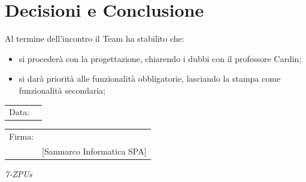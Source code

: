 \documentclass[a4paper,12pt]{article}
\begin{document}
\section{Decisioni e Conclusione}

Al termine dell’incontro il Team ha stabilito che:
\begin{itemize}
    \item si procederà con la progettazione, chiarendo i dubbi con il professore Cardin;
    \item si darà priorità alle funzionalità obbligatorie, lasciando la stampa come funzionalità secondaria;
\end{itemize}

\vfill

\begin{flushleft}
\begin{tabular}{@{}p{0.5in}p{2in}@{}}
Data: & \hrulefill \\
\end{tabular}

\vspace{1em}

\begin{tabular}{@{}p{0.5in}p{2in}@{}}
Firma: & \hrulefill \\
& [Sanmarco Informatica SPA] \\
\end{tabular}
\end{flushleft}

\begin{flushright}
\textit{7-ZPUs}
\end{flushright}
\end{document}

